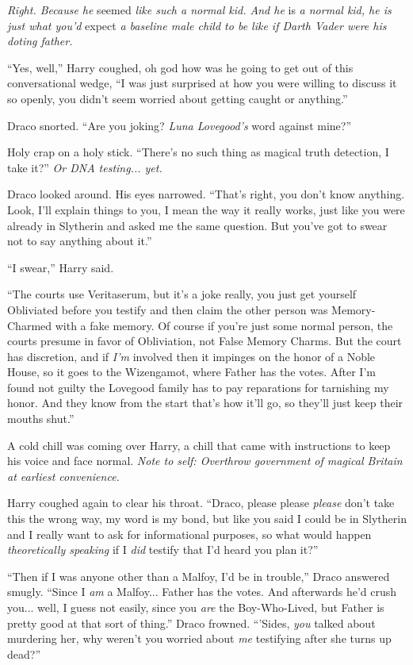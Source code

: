\emph{Right. Because he} seemed \emph{like such a normal kid. And he} is \emph{a normal kid, he is just what you'd} expect \emph{a baseline male child to be like if Darth Vader were his doting father.}

``Yes, well,'' Harry coughed, oh god how was he going to get out of this conversational wedge, ``I was just surprised at how you were willing to discuss it so openly, you didn't seem worried about getting caught or anything.''

Draco snorted. ``Are you joking? \emph{Luna Lovegood's} word against mine?''

Holy crap on a holy stick. ``There's no such thing as magical truth detection, I take it?'' \emph{Or DNA testing... yet.}

Draco looked around. His eyes narrowed. ``That's right, you don't know anything. Look, I'll explain things to you, I mean the way it really works, just like you were already in Slytherin and asked me the same question. But you've got to swear not to say anything about it.''

``I swear,'' Harry said.

``The courts use Veritaserum, but it's a joke really, you just get yourself Obliviated before you testify and then claim the other person was Memory-Charmed with a fake memory. Of course if you're just some normal person, the courts presume in favor of Obliviation, not False Memory Charms. But the court has discretion, and if \emph{I'm} involved then it impinges on the honor of a Noble House, so it goes to the Wizengamot, where Father has the votes. After I'm found not guilty the Lovegood family has to pay reparations for tarnishing my honor. And they know from the start that's how it'll go, so they'll just keep their mouths shut.''

A cold chill was coming over Harry, a chill that came with instructions to keep his voice and face normal. \emph{Note to self: Overthrow government of magical Britain at earliest convenience.}

Harry coughed again to clear his throat. ``Draco, please please \emph{please} don't take this the wrong way, my word is my bond, but like you said I could be in Slytherin and I really want to ask for informational purposes, so what would happen \emph{theoretically speaking} if I \emph{did} testify that I'd heard you plan it?''

``Then if I was anyone other than a Malfoy, I'd be in trouble,'' Draco answered smugly. ``Since I \emph{am} a Malfoy... Father has the votes. And afterwards he'd crush you... well, I guess not easily, since you \emph{are} the Boy-Who-Lived, but Father is pretty good at that sort of thing.'' Draco frowned. ``'Sides, \emph{you} talked about murdering her, why weren't you worried about \emph{me} testifying after she turns up dead?''

